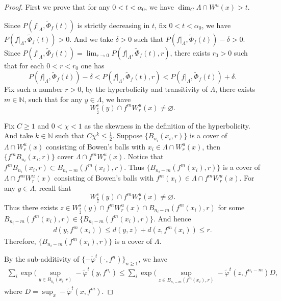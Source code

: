 \documentclass[11pt,a4paper]{amsart}
\theoremstyle{plain}
\theoremstyle{remark}
\begin{document}
	
	\begin{proof}
		First we prove that for any $0<t<\alpha_{0}$, we have $\dim_{C}\Lambda\cap W^{u}(x)> t$.
		
		Since $P(f|_{\Lambda},\tilde{\Phi}_{f}(t))$ is strictly decreasing in $t$, fix $0<t<\alpha_{0}$, we have  $P(f|_{\Lambda},\tilde{\Phi}_{f}(t))>0$. And we take $\delta>0$ such that $P(f|_{\Lambda},\tilde{\Phi}_{f}(t))-\delta>0$. Since $P(f|_{\Lambda},\tilde{\Phi}_{f}(t))=\lim_{r\rightarrow 0}P(f|_{\Lambda},\tilde{\Phi}_{f}(t),r)$, there exists $r_{0}>0$ such that for each $0<r<r_{0}$ one has
		$$P(f|_{\Lambda},\tilde{\Phi}_{f}(t))-\delta<P(f|_{\Lambda},\tilde{\Phi}_{f}(t),r)<P(f|_{\Lambda},\tilde{\Phi}_{f}(t))+\delta.$$
		Fix such a number $r>0$, by the hyperbolicity and transitivity of $\Lambda$, there exists $m\in\mathbb{N}$, such that for any $y\in\Lambda$, we have
		$$W_{\frac{r}{2}}^{s}(y)\cap f^{m}W_{r}^{u}(x)\neq \varnothing.$$
		
		
		Fix $C\geq 1$ and $0<\chi<1$ as the skewness in the definition of the hyperbolicity. And take $k\in \mathbb{N}$ such that $C\chi^{k}\leq \frac{1}{2}$.
		Suppose $\{B_{n_{i}}(x_{i},r)\}$ is a cover of $\Lambda\cap W^{u}_{r}(x)$ consisting of Bowen's balls with $x_{i}\in \Lambda\cap W^{u}_{r}(x)$, then $\{f^{m}B_{n_{i}}(x_{i},r)\}$ cover $\Lambda\cap f^{m}W^{u}_{r}(x)$. Notice that $f^{m}B_{n_{i}}(x_{i},r)\subset B_{n_{i}-m}(f^{m}(x_{i}),r)$. Thus $\{B_{n_{i}-m}(f^{m}(x_{i}),r)\}$ is a cover of $\Lambda\cap f^{m}W^{u}_{r}(x)$ consisting of Bowen's balls with $f^{m}(x_{i})\in \Lambda\cap f^{m}W^{u}_{r}(x)$. For any $y\in\Lambda$, recall that $$W_{\frac{r}{2}}^{s}(y)\cap f^{m}W_{r}^{u}(x)\neq \varnothing.$$
		Thus there exists $z\in W_{\frac{r}{2}}^{s}(y)\cap f^{m}W_{r}^{u}(x)\cap B_{n_{i}-m}(f^{m}(x_{i}),r)$ for some $B_{n_{i}-m}(f^{m}(x_{i}),r)\in \{B_{n_{i}-m}(f^{m}(x_{i}),r)\}$. And hence
		\begin{align*}
			d(y,f^{m}(x_{i}))\leq d(y,z)+d(z,f^{m}(x_{i}))\leq r.
		\end{align*}
		Therefore, $\{B_{n_{i}-m}(f^{m}(x_{i}),r)\}$ is a cover of $\Lambda$.
		
		By the sub-additivity of $\{-\tilde{\varphi}^{t}(\cdot,f^{n})\}_{n\geq 1}$, we have
		\begin{align*}
			\sum_{i}\exp(\sup_{y\in B_{n_{i}}(x_{i},r)}-\tilde{\varphi}^{t}(y,f^{n_{i}})\leq \sum_{i}\exp(\sup_{z\in B_{n_{i}-m}(f^{m}(x_{i}),r)}-\tilde{\varphi}^{t}(z,f^{n_{i}-m})D,
		\end{align*}
		where $D=\sup_{x}-\tilde{\varphi}^{t}(x,f^{m})$.
		

\end{proof}
\end{document}
